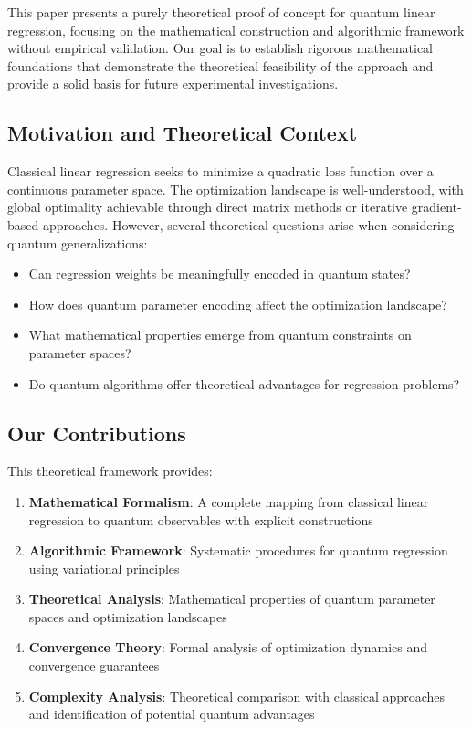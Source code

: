 \documentclass[11pt]{article}
\begin{document}
This paper presents a purely theoretical proof of concept for quantum linear regression, focusing on the mathematical construction and algorithmic framework without empirical validation. Our goal is to establish rigorous mathematical foundations that demonstrate the theoretical feasibility of the approach and provide a solid basis for future experimental investigations.

\subsection{Motivation and Theoretical Context}

Classical linear regression seeks to minimize a quadratic loss function over a continuous parameter space. The optimization landscape is well-understood, with global optimality achievable through direct matrix methods or iterative gradient-based approaches. However, several theoretical questions arise when considering quantum generalizations:

\begin{itemize}
\item Can regression weights be meaningfully encoded in quantum states?
\item How does quantum parameter encoding affect the optimization landscape?
\item What mathematical properties emerge from quantum constraints on parameter spaces?
\item Do quantum algorithms offer theoretical advantages for regression problems?
\end{itemize}

\subsection{Our Contributions}

This theoretical framework provides:

\begin{enumerate}
\item \textbf{Mathematical Formalism}: A complete mapping from classical linear regression to quantum observables with explicit constructions
\item \textbf{Algorithmic Framework}: Systematic procedures for quantum regression using variational principles
\item \textbf{Theoretical Analysis}: Mathematical properties of quantum parameter spaces and optimization landscapes
\item \textbf{Convergence Theory}: Formal analysis of optimization dynamics and convergence guarantees
\item \textbf{Complexity Analysis}: Theoretical comparison with classical approaches and identification of potential quantum advantages
\end{enumerate}
\end{document}
